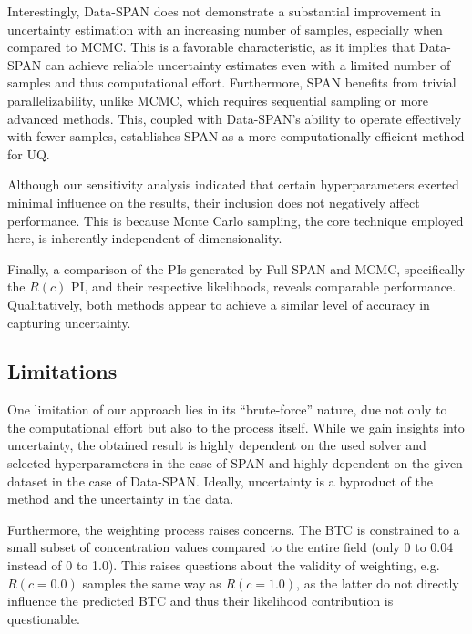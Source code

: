 Interestingly, Data-SPAN does not demonstrate a substantial improvement in uncertainty estimation with an increasing number of samples, especially when compared to MCMC. This is a favorable characteristic, as it implies that Data-SPAN can achieve reliable uncertainty estimates even with a limited number of samples and thus computational effort. Furthermore, SPAN benefits from trivial parallelizability, unlike MCMC, which requires sequential sampling or more advanced methods. This, coupled with Data-SPAN's ability to operate effectively with fewer samples, establishes SPAN as a more computationally efficient method for UQ.

Although our sensitivity analysis indicated that certain hyperparameters exerted minimal influence on the results, their inclusion does not negatively affect performance. This is because Monte Carlo sampling, the core technique employed here, is inherently independent of dimensionality.

Finally, a comparison of the PIs generated by Full-SPAN and MCMC, specifically the $R(c)$ PI, and their respective likelihoods, reveals comparable performance. Qualitatively, both methods appear to achieve a similar level of accuracy in capturing uncertainty.




\subsection{Limitations}
One limitation of our approach lies in its ``brute-force'' nature, due not only to the computational effort but also to the process itself. While we gain insights into uncertainty, the obtained result is highly dependent on the used solver and selected hyperparameters in the case of SPAN and highly dependent on the given dataset in the case of Data-SPAN. Ideally, uncertainty is a byproduct of the method and the uncertainty in the data.

Furthermore, the weighting process raises concerns. The BTC is constrained to a small subset of concentration values compared to the entire field (only 0 to 0.04 instead of 0 to 1.0). This raises questions about the validity of weighting, e.g. $R(c=0.0)$ samples the same way as $R(c=1.0)$, as the latter do not directly influence the predicted BTC and thus their likelihood contribution is questionable.


